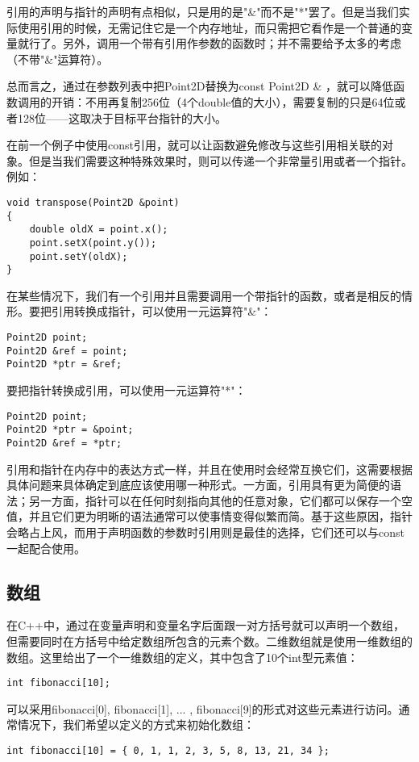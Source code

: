 \documentclass[11pt,oneside]{book}
\begin{document}
\begin{common-format}
引用的声明与指针的声明有点相似，只是用的是"\&{}"而不是"*"罢了。但是当我们实际使用引用的时候，无需记住它是一个内存地址，而只需把它看作是一个普通的变量就行了。另外，调用一个带有引用作参数的函数时；并不需要给予太多的考虑（不带"\&{}"运算符）。

总而言之，通过在参数列表中把Point2D替换为const Point2D \&{} ，就可以降低函数调用的开销：不用再复制256位（4个double值的大小），需要复制的只是64位或者128位——这取决于目标平台指针的大小。

在前一个例子中使用const引用，就可以让函数避免修改与这些引用相关联的对象。但是当我们需要这种特殊效果时，则可以传递一个非常量引用或者一个指针。例如：
\begin{Verbatim}
void transpose(Point2D &point)
{
    double oldX = point.x();
    point.setX(point.y());
    point.setY(oldX);
}
\end{Verbatim}

在某些情况下，我们有一个引用并且需要调用一个带指针的函数，或者是相反的情形。要把引用转换成指针，可以使用一元运算符"\&{}"：
\begin{Verbatim}
Point2D point;
Point2D &ref = point;
Point2D *ptr = &ref;
\end{Verbatim}


要把指针转换成引用，可以使用一元运算符"*"：
\begin{Verbatim}
Point2D point;
Point2D *ptr = &point;
Point2D &ref = *ptr;
\end{Verbatim}

引用和指针在内存中的表达方式一样，并且在使用时会经常互换它们，这需要根据具体问题来具体确定到底应该使用哪一种形式。一方面，引用具有更为简便的语法；另一方面，指针可以在任何时刻指向其他的任意对象，它们都可以保存一个空值，并且它们更为明晰的语法通常可以使事情变得似繁而简。基于这些原因，指针会略占上风，而用于声明函数的参数时引用则是最佳的选择，它们还可以与const一起配合使用。


\subsection{数组}
在C++中，通过在变量声明和变量名字后面跟一对方括号就可以声明一个数组，但需要同时在方括号中给定数组所包含的元素个数。二维数组就是使用一维数组的数组。这里给出了一个一维数组的定义，其中包含了10个int型元素值：
\begin{Verbatim}
int fibonacci[10];
\end{Verbatim}

可以采用fibonacci[0], fibonacci[1], ... , fibonacci[9]的形式对这些元素进行访问。通常情况下，我们希望以定义的方式来初始化数组：
\begin{Verbatim}
int fibonacci[10] = { 0, 1, 1, 2, 3, 5, 8, 13, 21, 34 };
\end{Verbatim}


\end{common-format}
\end{document}
